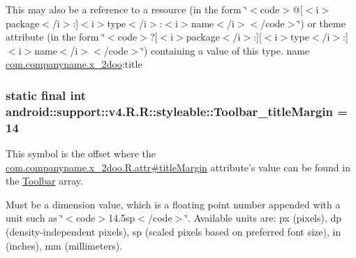 This may also be a reference to a resource (in the form \char`\"{}$<$code$>$@\mbox{[}$<$i$>$package$<$/i$>$:\mbox{]}$<$i$>$type$<$/i$>$:$<$i$>$name$<$/i$>$$<$/code$>$\char`\"{}) or theme attribute (in the form \char`\"{}$<$code$>$?\mbox{[}$<$i$>$package$<$/i$>$:\mbox{]}\mbox{[}$<$i$>$type$<$/i$>$:\mbox{]}$<$i$>$name$<$/i$>$$<$/code$>$\char`\"{}) containing a value of this type.  name \hyperlink{namespacecom_1_1companyname_1_1x__2doo}{com.companyname.x\_\-2doo}:title \hypertarget{classandroid_1_1support_1_1v4_1_1_r_1_1styleable_4b5c6289c4f1411b5ea97486e152a575}{
\subsubsection[{Toolbar\_\-titleMargin}]{\setlength{\rightskip}{0pt plus 5cm}static final int android::support::v4.R.R::styleable::Toolbar\_\-titleMargin = 14}}
\label{classandroid_1_1support_1_1v4_1_1_r_1_1styleable_4b5c6289c4f1411b5ea97486e152a575}


This symbol is the offset where the \hyperlink{classcom_1_1companyname_1_1x__2doo_1_1_r_1_1attr_3b6c3eb95c01aad475eb671f3df86055}{com.companyname.x\_\-2doo.R.attr\#titleMargin} attribute's value can be found in the \hyperlink{classandroid_1_1support_1_1v4_1_1_r_1_1styleable_0646d71cfbd4a8645c7d805b33e1c574}{Toolbar} array.

Must be a dimension value, which is a floating point number appended with a unit such as \char`\"{}$<$code$>$14.5sp$<$/code$>$\char`\"{}. Available units are: px (pixels), dp (density-independent pixels), sp (scaled pixels based on preferred font size), in (inches), mm (millimeters). 

